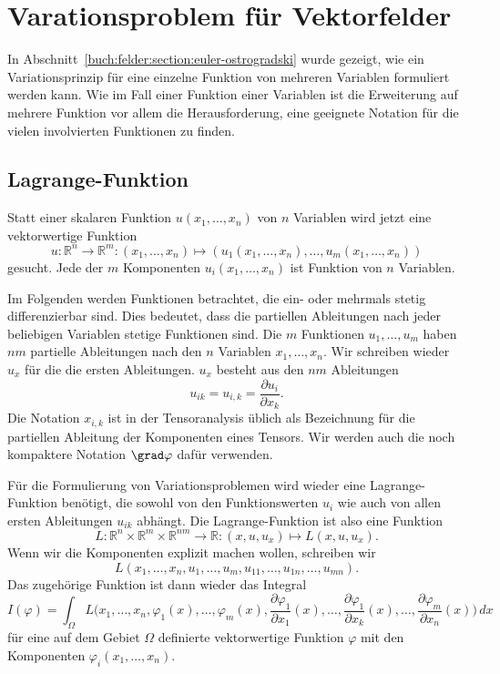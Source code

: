 %
%
%
\section{Varationsproblem für Vektorfelder
\label{buch:felder:section:vektorfelder}}
In Abschnitt~\ref{buch:felder:section:euler-ostrogradski} wurde gezeigt,
wie ein Variationsprinzip für eine einzelne Funktion von mehreren Variablen
formuliert werden kann.
Wie im Fall einer Funktion einer Variablen ist die Erweiterung auf
mehrere Funktion vor allem die Herausforderung, eine geeignete Notation
für die vielen involvierten Funktionen zu finden.

%
%
\subsection{Lagrange-Funktion
\label{buch:felder:vektorfeilder:subsetion:lagrange-funktion}}
Statt einer skalaren Funktion $u(x_1,\dots,x_n)$ von $n$ Variablen
wird jetzt eine vektorwertige Funktion
\[
u
\colon
\mathbb{R}^n \to \mathbb{R}^m
:
(x_1,\dots,x_n)
\mapsto
(
u_1(x_1,\dots,x_n)
,\dots,
u_m(x_1,\dots,x_n)
)
\]
gesucht.
Jede der $m$ Komponenten $u_i(x_1,\dots,x_n)$ ist Funktion von
$n$ Variablen.

Im Folgenden werden Funktionen betrachtet, die ein- oder mehrmals
stetig differenzierbar sind.
Dies bedeutet, dass die partiellen Ableitungen nach jeder beliebigen
Variablen stetige Funktionen sind.
Die $m$ Funktionen $u_1,\dots,u_m$ haben $nm$ partielle Ableitungen
nach den $n$ Variablen $x_1,\dots,x_n$.
Wir schreiben wieder $u_x$ für die die ersten Ableitungen.
$u_x$ besteht aus den $nm$ Ableitungen 
\[
u_{ik}
=
u_{i,k}
=
\frac{\partial u_i}{\partial x_k}.
\]
Die Notation $x_{i,k}$ ist in der Tensoranalysis üblich als Bezeichnung
für die partiellen Ableitung der Komponenten eines Tensors.
Wir werden auch die noch kompaktere Notation $\grad\varphi$ dafür 
verwenden.

Für die Formulierung von Variationsproblemen wird wieder eine
Lagrange-Funktion benötigt, die sowohl von den Funktionswerten
$u_i$ wie auch von allen ersten Ableitungen $u_{ik}$ abhängt.
Die Lagrange-Funktion ist also eine Funktion
\begin{equation*}
L
\colon
\mathbb{R}^n\times \mathbb{R}^m \times \mathbb{R}^{nm}\to\mathbb{R}
:
(x,u,u_x)
\mapsto
L(x,u,u_x).
\end{equation*}
Wenn wir die Komponenten explizit machen wollen, schreiben wir
\[
L(x_1,\dots,x_n,u_1,\dots,u_m,u_{11},\dots,u_{1n},\dots,u_{mn}).
\]
Das zugehörige Funktion ist dann wieder das Integral
\begin{equation}
I(\varphi)
=
\int_{\Omega}
L\biggl(x_1,\dots,x_n,
\varphi_1(x),\dots,\varphi_m(x),
\frac{\partial\varphi_1}{\partial x_1}(x),
\dots,
\frac{\partial\varphi_1}{\partial x_k}(x),
\dots,
\frac{\partial\varphi_m}{\partial x_n}(x)
\biggr)
\,dx
\label{buch:felder:vektorfelder:eqn:lagrange-funktional}
\end{equation}
für eine auf dem Gebiet $\Omega$ definierte vektorwertige Funktion
$\varphi$ mit den Komponenten $\varphi_i(x_1,\dots,x_n)$.

